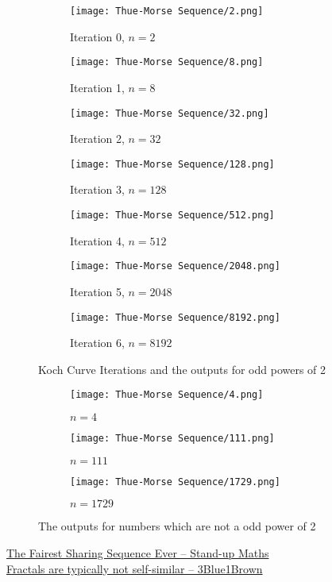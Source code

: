 \begin{figure}[H]
	\centering
	\begin{subfigure}{0.3\linewidth}
		\texttt{[image: Thue-Morse Sequence/2.png]}
		\caption{Iteration 0, $n=2$}
	\end{subfigure}
	\begin{subfigure}{0.3\linewidth}
		\texttt{[image: Thue-Morse Sequence/8.png]}
		\caption{Iteration 1, $n=8$}
	\end{subfigure}
	\begin{subfigure}{0.3\linewidth}
		\texttt{[image: Thue-Morse Sequence/32.png]}
		\caption{Iteration 2, $n=32$}
	\end{subfigure}
	\begin{subfigure}{0.3\linewidth}
		\texttt{[image: Thue-Morse Sequence/128.png]}
		\caption{Iteration 3, $n=128$}
	\end{subfigure}
	\begin{subfigure}{0.3\linewidth}
		\texttt{[image: Thue-Morse Sequence/512.png]}
		\caption{Iteration 4, $n=512$}
	\end{subfigure}
	\begin{subfigure}{0.3\linewidth}
		\texttt{[image: Thue-Morse Sequence/2048.png]}
		\caption{Iteration 5, $n=2048$}
	\end{subfigure}
	\begin{subfigure}{0.3\linewidth}
		\texttt{[image: Thue-Morse Sequence/8192.png]}
		\caption{Iteration 6, $n=8192$}
	\end{subfigure}
	\caption{Koch Curve Iterations and the outputs for odd powers of 2}
\end{figure}
\begin{figure}[H]
	\centering
	\begin{subfigure}{0.3\linewidth}
		\texttt{[image: Thue-Morse Sequence/4.png]}
		\caption{$n=4$}
	\end{subfigure}
	\begin{subfigure}{0.3\linewidth}
		\texttt{[image: Thue-Morse Sequence/111.png]}
		\caption{$n=111$}
	\end{subfigure}
	\begin{subfigure}{0.3\linewidth}
		\texttt{[image: Thue-Morse Sequence/1729.png]}
		\caption{$n=1729$}
	\end{subfigure}
	\caption{The outputs for numbers which are not a odd power of 2}
\end{figure}
\begin{funvideo}
	\href{https://youtu.be/prh72BLNjIk}{The Fairest Sharing Sequence Ever -- Stand-up Maths}\\
	\href{https://youtu.be/gB9n2gHsHN4}{Fractals are typically not self-similar -- 3Blue1Brown}
\end{funvideo}
